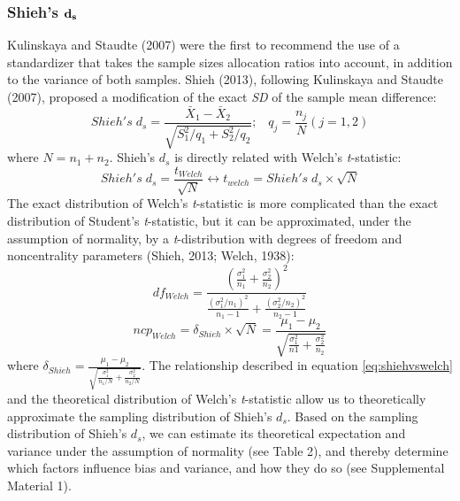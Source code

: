 \documentclass[
  english,
  man,floatsintext]{apa6}
\begin{document}
\hypertarget{shiehs-bf-d_s}{%
\subsubsection{\texorpdfstring{Shieh's \(\bf d_s\)}{Shieh's \textbackslash bf d\_s}}\label{shiehs-bf-d_s}}

Kulinskaya and Staudte (2007) were the first to recommend the use of a standardizer that takes the sample sizes allocation ratios into account, in addition to the variance of both samples. Shieh (2013), following Kulinskaya and Staudte (2007), proposed a modification of the exact \emph{SD} of the sample mean difference:
\begin{equation*} 
Shieh's \; d_s = \frac{\bar{X}_1 - \bar{X}_2}{\sqrt{S_1^2/q_1+S_2^2/q_2}}; \;\;\; q_j=\frac{n_j}{N} (j=1,2)
\label{eq:Shiehds}
\end{equation*}
where \(N = n_1+n_2\). Shieh's \(d_{s}\) is directly related with Welch's \emph{t}-statistic:
\begin{equation} 
Shieh's \; d_s=\frac{t_{Welch}}{\sqrt{N}}\leftrightarrow t_{welch} = Shieh's \; d_s \times \sqrt{N}
\label{eq:shiehvswelch}
\end{equation}
The exact distribution of Welch's \emph{t}-statistic is more complicated than the exact distribution of Student's \emph{t}-statistic, but it can be approximated, under the assumption of normality, by a \emph{t}-distribution with degrees of freedom and noncentrality parameters (Shieh, 2013; Welch, 1938):
\begin{equation} 
df_{Welch} = \frac{\left(\frac{\sigma^2_1}{n_1}+\frac{\sigma^2_2}{n_2} \right)^2}{\frac{(\sigma^2_1/n_1)^2}{n_1-1}+\frac{(\sigma^2_2/n_2)^2}{n_2-1}}
\label{eq:welchdf}
\end{equation}
\begin{equation*} 
ncp_{Welch} = \delta_{Shieh} \times \sqrt{N} = \frac{\mu_1-\mu_2}{\sqrt{\frac{\sigma_1^2}{n1}+\frac{\sigma_2^2}{n_2}}}
\label{eq:welchncp}
\end{equation*}
where \(\delta_{Shieh}=\frac{\mu_1-\mu_2}{\sqrt{\frac{\sigma_1^2}{n_1/N}+\frac{\sigma_2^2}{n_2/N}}}\). The relationship described in equation \ref{eq:shiehvswelch} and the theoretical distribution of Welch's \emph{t}-statistic allow us to theoretically approximate the sampling distribution of Shieh's \(d_s\). Based on the sampling distribution of Shieh's \(d_s\), we can estimate its theoretical expectation and variance under the assumption of normality (see Table 2), and thereby determine which factors influence bias and variance, and how they do so (see Supplemental Material 1).
\end{document}
